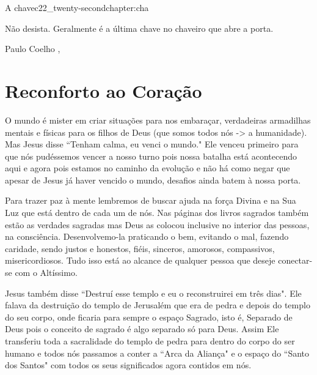 \begin{chapterpage}{A chave}{c22_twenty-secondchapter:cha}

\begin{myquotation}Não desista. Geralmente é a última chave no chaveiro que abre a porta.


 
\par\vspace*{15mm}
\mbox{}\hfill \emdash{}Paulo Coelho 
, %
\par\end{myquotation}

\end{chapterpage}



\section{Reconforto ao Coração}\label{c1_basicformatting:sec}

\emdash{}O mundo é mister em criar situações para nos embaraçar, verdadeiras armadilhas mentais e físicas para os filhos de Deus (que somos todos nós -> a humanidade). Mas Jesus disse ``Tenham calma, eu venci o mundo." Ele venceu primeiro para que nós pudéssemos vencer a nosso turno pois nossa batalha está acontecendo aqui e agora pois estamos no caminho da evolução e não há como negar que apesar de Jesus já haver vencido o mundo, desafios ainda batem à nossa porta.

\emdash{}Para trazer paz à mente lembremos de buscar ajuda na força Divina e na Sua Luz que está dentro de cada um de nós. Nas páginas dos livros sagrados também estão as verdades sagradas mas Deus as colocou inclusive no interior das pessoas, na consciência. Desenvolvemo-la praticando o bem, evitando o mal, fazendo caridade, sendo justos e honestos, fiéis, sinceros, amorosos, compassivos, misericordiosos. Tudo isso está ao alcance de qualquer pessoa que deseje conectar-se com o Altíssimo.

\emdash{}Jesus também disse ``Destruí esse templo e eu o reconstruirei em três dias". Ele falava da destruição do templo de Jerusalém que era de pedra e depois do templo do seu corpo, onde ficaria para sempre o espaço Sagrado, isto é, Separado de Deus pois o conceito de sagrado é algo separado só para Deus. Assim Ele transferiu toda a sacralidade do templo de pedra para dentro do corpo do ser humano e todos nós passamos a conter a ``Arca da Aliança" e o espaço do ``Santo dos Santos" com todos os seus significados agora contidos em nós.

